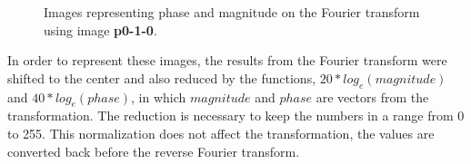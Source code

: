 \documentclass[12pt,a4paper]{article}
\begin{document}
\begin{figure}[!h]
	\centering
	\quad
	\caption{Images representing phase and magnitude on the Fourier transform using image \textbf{p0-1-0}.}
	\label{fig:mag-phase}
\end{figure}

In order to represent these images, the results from the Fourier transform were shifted to the center and also reduced by the functions, $20*log_e(magnitude)$ and $40*log_e(phase)$, in which $magnitude$ and $phase$ are vectors from the transformation. The reduction is necessary to keep the numbers in a range from 0 to 255. This normalization does not affect the transformation, the values are converted back before the reverse Fourier transform. \\
\end{document}
